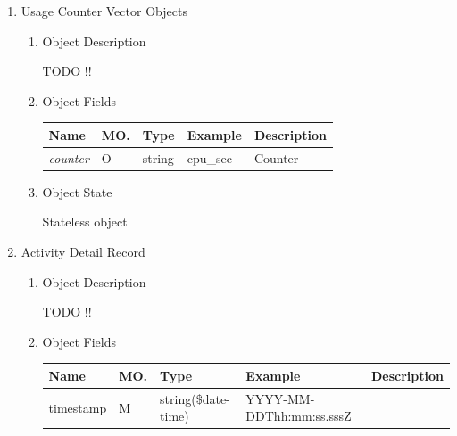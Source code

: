 \begin{enumerate}

\item Usage Counter Vector Objects

\begin{enumerate}

\item Object Description

TODO !!

\item Object Fields

\begin{table}[H]
\footnotesize

\begin{center}
\begin{tabular}{|p{3cm}|l|p{3cm}|p{3cm}|p{4cm}|} 
\hline
\rowcolor{lightgray}	Name	& MO.	& Type	& Example & 	Description \\
\hline

{\it counter} 	& O & string & cpu\_sec		& Counter \\
\hline 		

\end{tabular}
\end{center}
\end{table}

\item Object State

Stateless object

\end{enumerate}

\item Activity Detail Record

\begin{enumerate}

\item Object Description

TODO !!

\item Object Fields

\begin{table}[H]
\footnotesize

\begin{center}
\begin{tabular}{|p{3cm}|l|p{3cm}|p{3cm}|p{4cm}|} 
\hline
\rowcolor{lightgray}	Name	& MO.	& Type	& Example & 	Description \\
\hline

timestamp 			& M & string(\$date-time) 	&  YYYY-MM-DDThh:mm:ss.sssZ	&  \\
\hline


\end{tabular}
\end{center}
\end{table}
\end{enumerate}
\end{enumerate}
